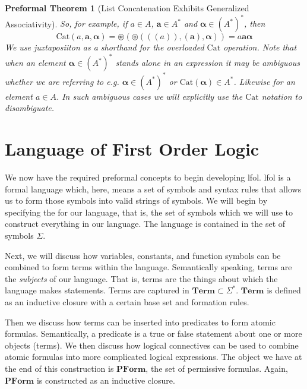 \documentclass[oneside, 12pt]{book}
\theoremstyle{break}
\newtheorem{preformal definition}[definition]{Preformal Definition}
\newtheorem{preformal theorem}[theorem]{Preformal Theorem}
\newcommand{\bv}[1]{\boldsymbol{#1}}
\begin{document}
\begin{preformal theorem}[List Concatenation Exhibits Generalized Associativity]
				So, for example, if $a\in A$, $\bv{a} \in A^*$ and $\bv{\alpha}\in (A^*)^*$, then
				\begin{equation*}
					\text{Cat}(a, \bv{a}, \bv{\alpha}) = \circledast(\circledcirc(((a)), (\bv{a}), \bv{\alpha})) = a \bv{a}\bv{\alpha} 
				\end{equation*} 
				We use juxtaposiiton as a shorthand for the overloaded $\text{Cat}$ operation.
				Note that when an element $\bv{\alpha} \in (A^*)^*$ stands alone in an expression it may be ambiguous whether we are referring to e.g. $\bv{\alpha}\in (A^*)^*$ or $\text{Cat}(\bv{\alpha}) \in A^*$.
				Likewise for an element $a\in A$.
				In such ambiguous cases we will explicitly use the $\text{Cat}$ notation to disambiguate.
				
			\end{preformal theorem}
	
	\chapter{Language of First Order Logic}
	
		We now have the required preformal concepts to begin developing  \gls{lfol}.
		\gls{lfol} is a formal language which, here, means a set of symbols and syntax rules that allows us to form those symbols into valid strings of symbols.
		We will begin by specifying the  for our language, that is, the set of symbols which we will use to construct everything in our language.
		The language is contained in the set of symbols $\Sigma$.
		
		Next, we will discuss how variables, constants, and function symbols can be combined to form terms within the language.
		Semantically speaking, terms are the \textit{subjects} of our language. 
		That is, terms are the things about which the language makes statements.
		Terms are captured in $\textbf{Term} \subset \Sigma^*$.	
		$\textbf{Term}$ is defined as an inductive closure with a certain base set and formation rules.
		
		Then we discuss how terms can be inserted into predicates to form atomic formulas.
		Semantically, a predicate is a true or false statement about one or more objects (terms).
		We then discuss how logical connectives can be used to combine atomic formulas into more complicated logical expressions.
		The object we have at the end of this construction is $\textbf{PForm}$, the set of permissive formulas.
		Again, $\textbf{PForm}$ is constructed as an inductive closure.
		
\end{document}
